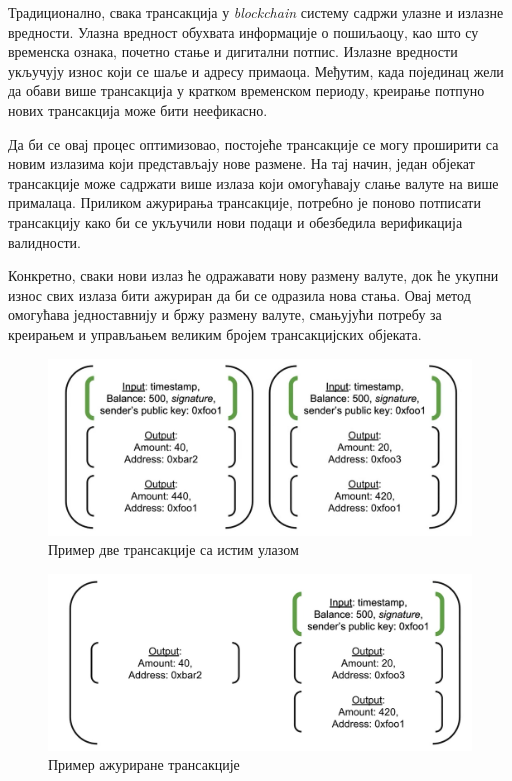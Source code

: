 \documentclass[12pt, a4paper]{article}
\begin{document}
Традиционално, свака трансакција у \textit{blockchain} систему садржи улазне и излазне вредности. Улазна вредност обухвата информације о пошиљаоцу, као што су временска ознака, почетно стање и дигитални потпис. Излазне вредности укључују износ који се шаље и адресу примаоца. Међутим, када појединац жели да обави више трансакција у кратком временском периоду, креирање потпуно нових трансакција може бити неефикасно.

Да би се овај процес оптимизовао, постојеће трансакције се могу проширити са новим излазима који представљају нове размене. На тај начин, један објекат трансакције може садржати више излаза који омогућавају слање валуте на више прималаца. Приликом ажурирања трансакције, потребно је поново потписати трансакцију како би се укључили нови подаци и обезбедила верификација валидности.

Конкретно, сваки нови излаз ће одражавати нову размену валуте, док ће укупни износ свих излаза бити ажуриран да би се одразила нова стања. Овај метод омогућава једноставнију и бржу размену валуте, смањујући потребу за креирањем и управљањем великим бројем трансакцијских објеката.


\begin{figure}[h]
    \centering
    \includegraphics[width=1\linewidth]{slike/transaction-updates-1.png}
    \caption{Пример две трансакције са истим улазом}
    \label{fig:transaction-updates-before}
\end{figure}

\begin{figure}[h]
    \centering
    \includegraphics[width=1\linewidth]{slike/transaction-updates-2.png}
    \caption{Пример ажуриране трансакције}
    \label{fig:transaction-updates-now}
\end{figure}
\end{document}
